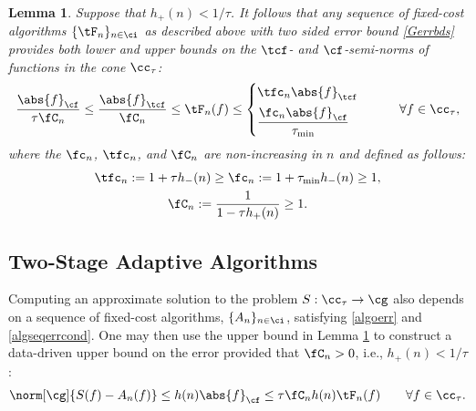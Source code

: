\documentclass[]{elsarticle}
\newtheorem{lem}{Lemma}
\theoremstyle{definition}
\theoremstyle{remark}
\newcommand{\Fnorm}[1]{\abs{#1}_{\cf}}
\newcommand{\Ftnorm}[1]{\abs{#1}_{\tcf}}
\begin{document}
\begin{lem} \label{Gnormlem} Suppose that $h_{ +}(n) < 1/\tau$.  It follows that any sequence of fixed-cost algorithms $\{\tF_n\}_{n \in \ci}$ as described above with two sided error bound \eqref{Gerrbds} provides both lower and upper bounds on the $\tcf$- and $\cf$-semi-norms of functions in the cone $\cc_{\tau}$:
\begin{equation} \label{twosidedGineq}
 \frac{\Fnorm{f}}{\tau \fC_n}  \le \frac{\Ftnorm{f}}{\fC_n}  \le \tF_n(f) \le  \begin{cases} \tfc_n \Ftnorm{f} \\[1ex]
\displaystyle \frac{\fc_n \Fnorm{f} }{\tau_{\min}}
\end{cases} \qquad \forall f \in \cc_{\tau},
\end{equation}
where the $\fc_n$, $\tfc_n$, and $\fC_n$ are non-increasing in $n$ and defined as follows:
\begin{gather} \label{normdeflate}
\tfc_n :=1 + \tau h_{ -}(n)  \ge \fc_n :=1 + \tau_{\min} h_{ -}(n)  \ge 1, \\
\label{norminflate}
\fC_n :=\frac{1}{1 - \tau h_{ +}(n)} \ge 1.
\end{gather}
\end{lem}

\subsection{Two-Stage Adaptive Algorithms} \label{twostagesec}

Computing an approximate solution to the problem $S: \cc_{\tau} \to \cg$ also depends on a sequence of fixed-cost algorithms, $\{A_n\}_{n \in \ci}$, satisfying \eqref{algoerr} and \eqref{algseqerrcond}.  One may then use the upper bound in Lemma \ref{Gnormlem} to construct a data-driven upper bound on the error provided that $\fC_n>0$, i.e.,  $h_{ +}(n) < 1/\tau$:
\begin{equation} \label{Anerrbound}
\norm[\cg]{S(f) -  A_n(f)} \le h(n)\Fnorm{f} \le \tau  \fC_n h(n)\tF_n(f) \qquad \forall f \in \cc_{\tau}.
\end{equation}
\end{document}
